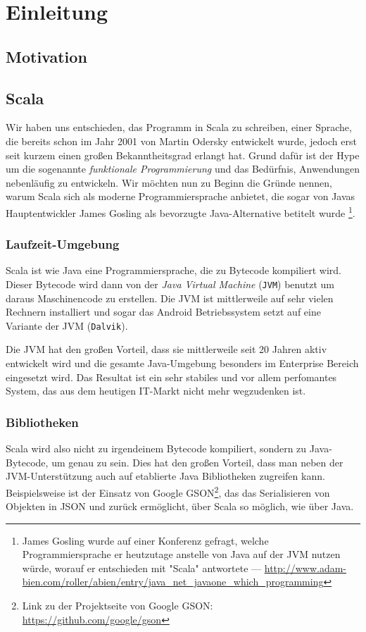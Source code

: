 \chapter{Einleitung}\label{chap:intro}
\section{Motivation}

\section{Scala}
Wir haben uns entschieden, das Programm in Scala zu schreiben, einer Sprache, die bereits schon im Jahr 2001 von Martin Odersky entwickelt wurde, jedoch erst seit kurzem einen großen Bekanntheitsgrad erlangt hat. Grund dafür ist der Hype um die sogenannte \textit{funktionale Programmierung} und das Bedürfnis, Anwendungen nebenläufig zu entwickeln.
Wir möchten nun zu Beginn die Gründe nennen, warum Scala sich als moderne Programmiersprache anbietet, die sogar von Javas Hauptentwickler James Gosling als bevorzugte Java-Alternative betitelt wurde \footnote{James Gosling wurde auf einer Konferenz gefragt, welche Programmiersprache er heutzutage anstelle von Java auf der JVM nutzen würde, worauf er entschieden mit "Scala" antwortete --- \url{http://www.adam-bien.com/roller/abien/entry/java_net_javaone_which_programming}}.

\subsection{Laufzeit-Umgebung}
Scala ist wie Java eine Programmiersprache, die zu Bytecode kompiliert wird. Dieser Bytecode wird dann von der \textit{Java Virtual Machine} (\texttt{JVM}) benutzt um daraus Maschinencode zu erstellen. Die JVM ist mittlerweile auf sehr vielen Rechnern installiert und sogar das Android Betriebssystem setzt auf eine Variante der JVM (\texttt{Dalvik}).

Die JVM hat den großen Vorteil, dass sie mittlerweile seit 20 Jahren aktiv entwickelt wird und die gesamte Java-Umgebung besonders im Enterprise Bereich eingesetzt wird. Das Resultat ist ein sehr stabiles und vor allem perfomantes System, das aus dem heutigen IT-Markt nicht mehr wegzudenken ist.

\subsection{Bibliotheken}
Scala wird also nicht zu irgendeinem Bytecode kompiliert, sondern zu Java-Bytecode, um genau zu sein. Dies hat den großen Vorteil, dass man neben der JVM-Unterstützung auch auf etablierte Java Bibliotheken zugreifen kann. Beispielsweise ist der Einsatz von Google GSON\footnote{Link zu der Projektseite von Google GSON: \url{https://github.com/google/gson}}, das das Serialisieren von Objekten in JSON und zurück ermöglicht, über Scala so möglich, wie über Java.

